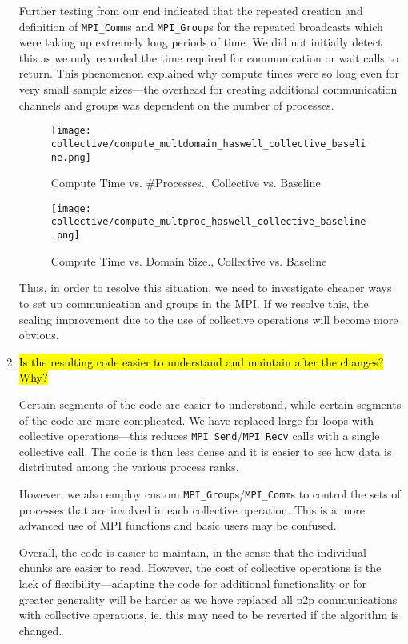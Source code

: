 \begin{enumerate}
	Further testing from our end indicated that the repeated creation and definition of \verb!MPI_Comm!s and
	\verb!MPI_Group!s for the repeated broadcasts which were taking up extremely long periods of time. We did
	not initially detect this as we only recorded the time required for communication or wait calls to return.
	This phenomenon explained why compute times were so long even for very small sample sizes---the overhead
	for creating additional communication channels and groups was dependent on the number of processes. 

		\begin{figure}[h] %
		\texttt{[image: collective/compute\_multdomain\_haswell\_collective\_baseline.png]}
		\caption{Compute Time vs. \#Processes., Collective vs. Baseline}
		\label{fig:compute_multdomain_collective_baseline}
	\end{figure}	
	
	\begin{figure}[h] %
		\texttt{[image: collective/compute\_multproc\_haswell\_collective\_baseline.png]}
		\caption{Compute Time vs. Domain Size., Collective vs. Baseline}
		\label{fig:compute_multprocess_collective_baseline}
	\end{figure}	
	
	Thus, in order to resolve this situation, we need to investigate cheaper ways to set up communication
	and groups in the MPI. If we resolve this, the scaling improvement due to the use of collective 
	operations will become more obvious.
	
	\item \hl{Is the resulting code easier to understand and maintain after the changes? Why?}	
	
	Certain segments of the code are easier to understand, while certain segments of the code are more 		
	complicated. We have replaced large for loops with collective operations---this reduces 
	\verb!MPI_Send!/\verb!MPI_Recv! calls with a single collective call. The code is then less dense and it
	 is easier to see how data is distributed among the various process ranks.

	However, we also employ custom \verb!MPI_Group!s/\verb!MPI_Comm!s to control the sets of 
	processes that are involved in each collective operation. This is a more advanced use of MPI 
	functions and basic users may be confused. 

	Overall, the code is easier to maintain, in the sense that the individual chunks are easier to 
	read. However, the cost of collective operations is the lack of flexibility---adapting the code 
	for additional functionality or for greater generality will be harder as we have replaced all p2p 
	communications with collective operations, ie. this may need to be reverted if the algorithm is 
	changed.	
	
\end{enumerate}

		



